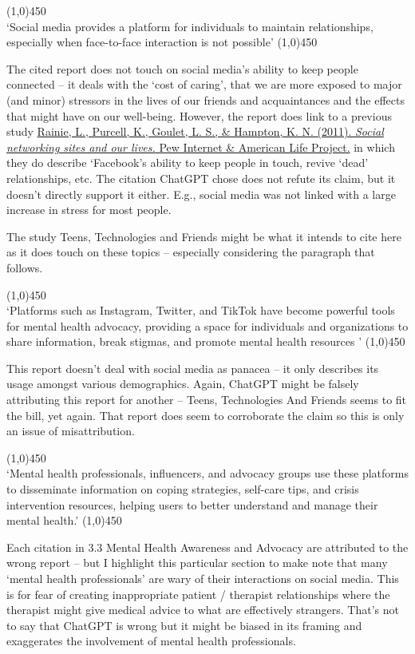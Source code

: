 \documentclass[12pt]{article}
\begin{document}
\begin{center}
    \line(1,0){450}\\
    `Social media provides a platform for individuals to maintain relationships, especially when face-to-face interaction is not possible\cite{hampton2014}'
    \line(1,0){450}
\end{center}
The cited report does not touch on social media's ability to keep people connected -- it deals with the `cost of caring', that we are more exposed to major (and minor) stressors in the lives of our friends and acquaintances and the effects that might have on our well-being. However, the report does link to a previous study  \href{https://www.pewresearch.org/internet/2011/06/16/social-networking-sites-and-our-lives/}{Rainie, L., Purcell, K., Goulet, L. S., \& Hampton, K. N. (2011). \textit{Social networking sites and our lives.} Pew Internet \& American Life Project.}
in which they do describe `Facebook's ability to keep people in touch, revive `dead' relationships, etc. The citation ChatGPT chose does not refute its claim, but it doesn't directly support it either. E.g., social media was not linked with a large increase in stress for most people.

The study Teens, Technologies and Friends\cite{lenhart2015} might be what it intends to cite here as it does touch on these topics -- especially considering the paragraph that follows. 

\begin{center}
    \line(1,0){450}\\
    `Platforms such as Instagram, Twitter, and TikTok have become powerful tools for mental health advocacy, providing a space for individuals and organizations to share information, break stigmas, and promote mental health resources \cite{smith2018}'
    \line(1,0){450}
\end{center}
This report doesn't deal with social media as panacea -- it only describes its usage amongst various demographics. Again, ChatGPT might be falsely attributing this report for another -- Teens, Technologies And Friends\cite{lenhart2015} seems to fit the bill, yet again. That report does seem to corroborate the claim so this is only an issue of misattribution.

\begin{center}
    \line(1,0){450}\\
    `Mental health professionals, influencers, and advocacy groups use these platforms to disseminate information on coping strategies, self-care tips, and crisis intervention resources, helping users to better understand and manage their mental health.'
    \line(1,0){450}
\end{center}
Each citation in 3.3 Mental Health Awareness and Advocacy are attributed to the wrong report -- but I highlight this particular section to make note that many `mental health professionals' are wary of their interactions on social media. This is for fear of creating inappropriate patient / therapist relationships where the therapist might give medical advice to what are effectively strangers. That's not to say that ChatGPT is wrong but it might be biased in its framing and exaggerates the involvement of mental health professionals. 
\end{document}
